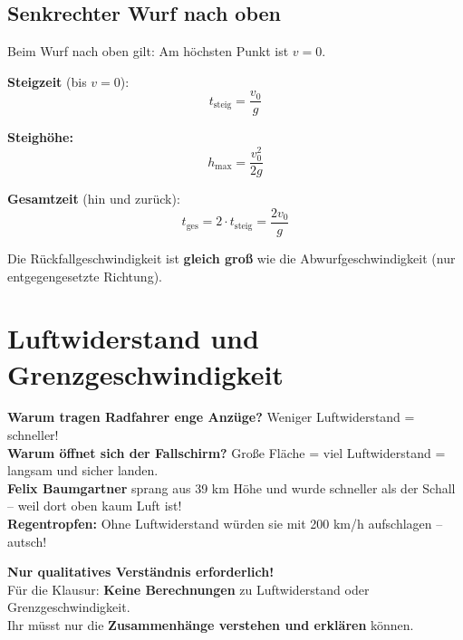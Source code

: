 \documentclass[11pt,a4paper]{article}
\begin{document}
\subsection{Senkrechter Wurf nach oben}

Beim Wurf nach oben gilt: Am höchsten Punkt ist $v = 0$.

\begin{formelbox}
\textbf{Steigzeit} (bis $v = 0$):
\[
t_{\text{steig}} = \frac{v_0}{g}
\]

\textbf{Steighöhe:}
\[
h_{\text{max}} = \frac{v_0^2}{2g}
\]

\textbf{Gesamtzeit} (hin und zurück):
\[
t_{\text{ges}} = 2 \cdot t_{\text{steig}} = \frac{2v_0}{g}
\]
\end{formelbox}

\begin{merksatz}
Die Rückfallgeschwindigkeit ist \textbf{gleich groß} wie die Abwurfgeschwindigkeit (nur entgegengesetzte Richtung).
\end{merksatz}

\newpage
\section{Luftwiderstand und Grenzgeschwindigkeit}

\begin{alltag}
\textbf{Warum tragen Radfahrer enge Anzüge?} Weniger Luftwiderstand = schneller!\\[0.3em]
\textbf{Warum öffnet sich der Fallschirm?} Große Fläche = viel Luftwiderstand = langsam und sicher landen.\\[0.3em]
\textbf{Felix Baumgartner} sprang aus 39 km Höhe und wurde schneller als der Schall -- weil dort oben kaum Luft ist!\\[0.3em]
\textbf{Regentropfen:} Ohne Luftwiderstand würden sie mit 200 km/h aufschlagen -- autsch!
\end{alltag}

\begin{tcolorbox}[colback=tipporange!20, colframe=tipporange, boxrule=2pt]
\centering
\textbf{\large Nur qualitatives Verständnis erforderlich!}\\[0.3em]
\normalsize
Für die Klausur: \textbf{Keine Berechnungen} zu Luftwiderstand oder Grenzgeschwindigkeit.\\
Ihr müsst nur die \textbf{Zusammenhänge verstehen und erklären} können.
\end{tcolorbox}
\end{document}
